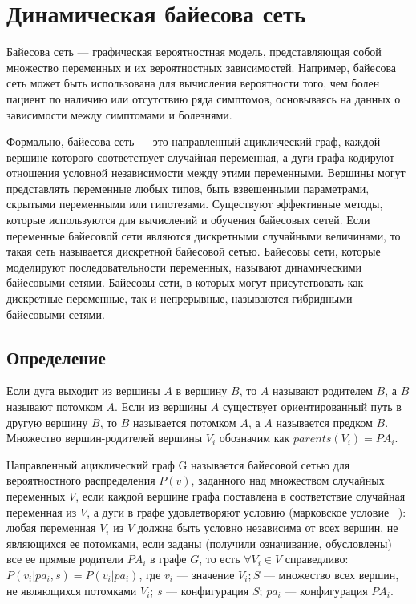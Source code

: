 \section{Динамическая байесова сеть}

Байесова сеть — графическая вероятностная модель, представляющая собой множество переменных и их вероятностных зависимостей. Например, байесова сеть может быть использована для вычисления вероятности того, чем болен пациент по наличию или отсутствию ряда симптомов, основываясь на данных о зависимости между симптомами и болезнями.

Формально, байесова сеть — это направленный ациклический граф, каждой вершине которого соответствует случайная переменная, а дуги графа кодируют отношения условной независимости между этими переменными. Вершины могут представлять переменные любых типов, быть взвешенными параметрами, скрытыми переменными или гипотезами. Существуют эффективные методы, которые используются для вычислений и обучения байесовых сетей. Если переменные байесовой сети являются дискретными случайными величинами, то такая сеть называется дискретной байесовой сетью. Байесовы сети, которые моделируют последовательности переменных, называют динамическими байесовыми сетями. Байесовы сети, в которых могут присутствовать как дискретные переменные, так и непрерывные, называются гибридными байесовыми сетями. 

\subsection{Определение}
Если дуга выходит из вершины $A$ в вершину $B$, то $A$ называют родителем $B$, а $B$ называют потомком $A$. Если из вершины $A$ существует ориентированный путь в другую вершину $B$, то $B$ называется потомком $A$, а $A$ называется предком $B$. Множество вершин-родителей вершины $V_i$ обозначим как $parents(V_i) = PA_i$.

Направленный ациклический граф G называется байесовой сетью для вероятностного распределения $P(v)$, заданного над множеством случайных переменных $V$, если каждой вершине графа поставлена в соответствие случайная переменная из $V$, а дуги в графе удовлетворяют условию (марковское условие ~\cite{m_chain}): любая переменная $V_i$ из $V$ должна быть условно независима от всех вершин, не являющихся ее потомками, если заданы (получили означивание, обусловлены) все ее прямые родители $PA_i$ в графе $G$, то есть $\forall V_i \in V$ справедливо: $P(v_i|pa_i,s) = P(v_i|pa_i)$, где $v_i$ — значение $V_i; S$ — множество всех вершин, не являющихся потомками $V_i$; $s$ — конфигурация $S$; $pa_i$ — конфигурация $PA_i$.

